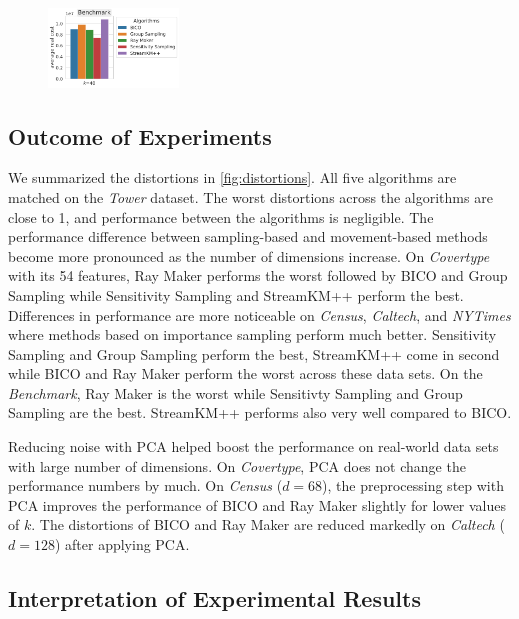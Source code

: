 \begin{figure}
{    \includegraphics[width=0.31\textwidth]{figures/real-costs-Benchmark-k40.pdf}
  }
\end{figure}





\subsection{Outcome of Experiments}
We summarized the distortions in \cref{fig:distortions}.
All five algorithms are matched on the \textit{Tower} dataset. The worst distortions across the algorithms are close to 1, and performance between the algorithms is negligible. The performance difference between sampling-based and movement-based methods become more pronounced as the number of dimensions increase. On \textit{Covertype} with its 54 features, Ray Maker performs the worst followed by BICO and Group Sampling while Sensitivity Sampling and StreamKM++ perform the best. Differences in performance are more noticeable on \textit{Census}, \textit{Caltech}, and \textit{NYTimes}  where methods based on importance sampling perform much better. Sensitivity Sampling and Group Sampling perform the best, StreamKM++ come in second while BICO and Ray Maker perform the worst across these data sets.
On the \textit{Benchmark}, Ray Maker is the worst while Sensitivty Sampling and Group Sampling are the best. StreamKM++ performs also very well compared to BICO.

Reducing noise with PCA helped boost the performance on real-world data sets with large number of dimensions. On \textit{Covertype}, PCA does not change the performance numbers by much. On \textit{Census} ($d=68$), the preprocessing step with PCA improves the performance of BICO and Ray Maker slightly for lower values of $k$. The distortions of BICO and Ray Maker are reduced markedly on \textit{Caltech} ($d=128$) after applying PCA. 


\subsection{Interpretation of Experimental Results}


